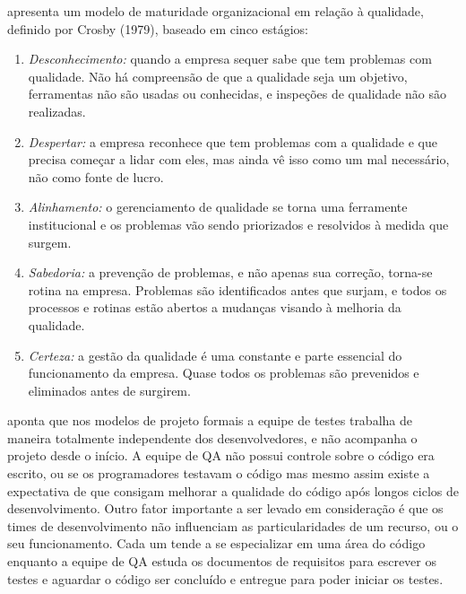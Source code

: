 \documentclass[
	12pt,				%
	openright,			%
	oneside,			%
	a4paper,			%
	english,			%
	brazil,				%
	]{abntex2}
\begin{document}
 apresenta um modelo de maturidade organizacional em relação à qualidade, definido por Crosby (1979), baseado em cinco estágios:
\begin{enumerate}
    \item \emph{Desconhecimento:} quando a empresa sequer sabe que tem problemas com qualidade. Não há compreensão de que a qualidade seja um objetivo, ferramentas não são usadas ou conhecidas, e inspeções de qualidade não são realizadas.
    \item \emph{Despertar:} a empresa reconhece que tem problemas com a qualidade e que precisa começar a lidar com eles, mas ainda vê isso como um mal necessário, não como fonte de lucro.
    \item \emph{Alinhamento:} o gerenciamento de qualidade se torna uma ferramente institucional e os problemas vão sendo priorizados e resolvidos à medida que surgem.
    \item \emph{Sabedoria:} a prevenção de problemas, e não apenas sua correção, torna-se rotina na empresa. Problemas são identificados antes que surjam, e todos os processos e rotinas estão abertos a mudanças visando à melhoria da qualidade.
    \item \emph{Certeza:} a gestão da qualidade é uma constante e parte essencial do funcionamento da empresa. Quase todos os problemas são prevenidos e eliminados antes de surgirem.
\end{enumerate}



 aponta que nos modelos de projeto formais a equipe de testes trabalha de maneira totalmente independente dos desenvolvedores, e não acompanha o projeto desde o início. A equipe de QA não possui controle sobre o código era escrito, ou se os programadores testavam o código mas mesmo assim existe a expectativa de que consigam melhorar a qualidade do código após longos ciclos de desenvolvimento. Outro fator importante a ser levado em consideração é que os times de desenvolvimento não influenciam as particularidades de um recurso, ou o seu funcionamento. Cada um tende a se especializar em uma área do código enquanto a equipe de QA estuda os documentos de requisitos para escrever os testes e aguardar o código ser concluído e entregue para poder iniciar os testes.
\end{document}
